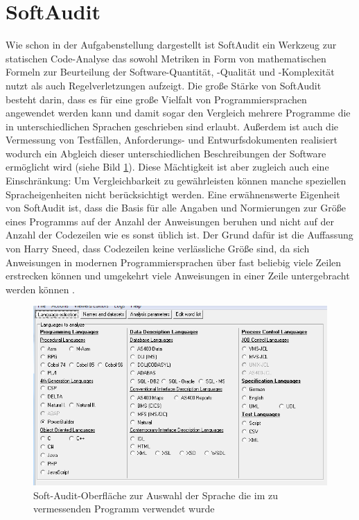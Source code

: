 \documentclass[gb,ngerman]{stthesis}
\begin{document}
     \section{SoftAudit}
     	Wie schon in der Aufgabenstellung dargestellt ist SoftAudit ein Werkzeug zur statischen Code-Analyse das sowohl Metriken in Form von mathematischen Formeln zur Beurteilung der Software-Quantität, -Qualität und -Komplexität nutzt als auch Regelverletzungen aufzeigt. Die große Stärke von SoftAudit besteht darin, dass es für eine große Vielfalt von Programmiersprachen angewendet werden kann und damit sogar den Vergleich mehrere Programme die in unterschiedlichen Sprachen geschrieben sind erlaubt. Außerdem ist auch die Vermessung von Testfällen, Anforderungs- und Entwurfsdokumenten realisiert wodurch ein Abgleich dieser unterschiedlichen Beschreibungen der Software ermöglicht wird (siehe Bild \ref{softaudit}). Diese Mächtigkeit ist aber zugleich auch eine Einschränkung: Um Vergleichbarkeit zu gewährleisten können manche speziellen Spracheigenheiten nicht berücksichtigt werden. Eine erwähnenswerte Eigenheit von SoftAudit ist, dass die Basis für alle Angaben und Normierungen zur Größe eines Programms auf der Anzahl der Anweisungen beruhen und nicht auf der Anzahl der Codezeilen wie es sonst üblich ist. Der Grund dafür ist die Auffassung von Harry Sneed, dass Codezeilen keine verlässliche Größe sind, da sich Anweisungen in modernen Programmiersprachen über fast beliebig viele Zeilen erstrecken können und umgekehrt viele Anweisungen in einer Zeile untergebracht werden können \cite{SoftwareInZahlen}. \newline
     	\begin{figure} [h]
			\centering
			\includegraphics [width=\textwidth] {softaudit.png}
			\caption{Soft-Audit-Oberfläche zur Auswahl der Sprache die im zu vermessenden Programm verwendet wurde}
			\label{softaudit}
		\end{figure}
\end{document}
